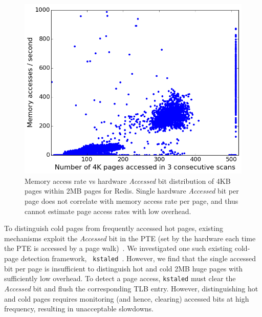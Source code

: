 \begin{figure}[t]
\centering
\includegraphics[width=1.0\columnwidth]{asplos2017/figures/redis-plot-3.png}
\caption{Memory access rate vs hardware {\it Accessed} bit distribution of 4KB
pages within 2MB pages for Redis. Single hardware {\it Accessed} bit per page
does not correlate with memory access rate per page, and thus cannot
estimate page access rates with low overhead.}
\label{fig:redis-access-bit}
\end{figure}

To distinguish cold pages from frequently accessed hot pages, existing
mechanisms exploit the \emph{Accessed} bit in the PTE (set by the hardware each time
the PTE is accessed by a page walk)~\cite{kstaled,vmware-mm,
ref:Guo:2015:PBL:2731186.2731187}. We
investigated one such existing cold-page detection framework, {\tt
kstaled}~\cite{kstaled}. However, we find that the single accessed bit
per page is insufficient to distinguish hot and cold 2MB huge pages with 
sufficiently low overhead. To detect a page access, {\tt kstaled} must clear the
 \emph{Accessed} bit  and flush the corresponding TLB entry.  However, 
 distinguishing hot and cold pages requires monitoring (and hence, clearing)
 accessed bits at high frequency, resulting in unacceptable slowdowns.

